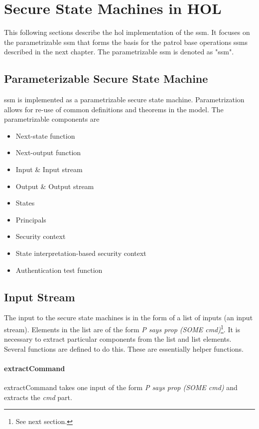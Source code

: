 \documentclass[../../main/main.tex]{subfiles}
\begin{document}
\section{Secure State Machines in HOL}\label{sec:sminHOL}
This following sections describe the \gls{hol} implementation of the \gls{ssm}.  It focuses on the parametrizable \gls{ssm} that forms the basis for the patrol base operations \glspl{ssm} described in the next chapter.  The parametrizable \gls{ssm} is denoted as "ssm".

\subsection{Parameterizable Secure State Machine}
ssm is implemented as a parametrizable secure state machine. Parametrization allows for re-use of common definitions and theorems in the  model.  The parametrizable components are
\begin{itemize}
\item Next-state function
\item Next-output function
\item Input \& Input stream
\item Output \& Output stream
\item States
\item Principals
\item Security context
\item State interpretation-based security context
\item Authentication test function
\end{itemize}


\subsection{Input Stream}
The input to the secure state machines is in the form of a list of inputs (an input stream).  Elements in the list are of the form \textit{P says prop (SOME cmd)}\footnote{See next section.}.  It is necessary to extract particular components from the list and list elements.  Several functions are defined to do this.  These are essentially helper functions.

\paragraph*{extractCommand}
extractCommand takes one input of the form \textit{P says prop (SOME cmd)} and extracts the \textit{cmd} part.
\end{document}
